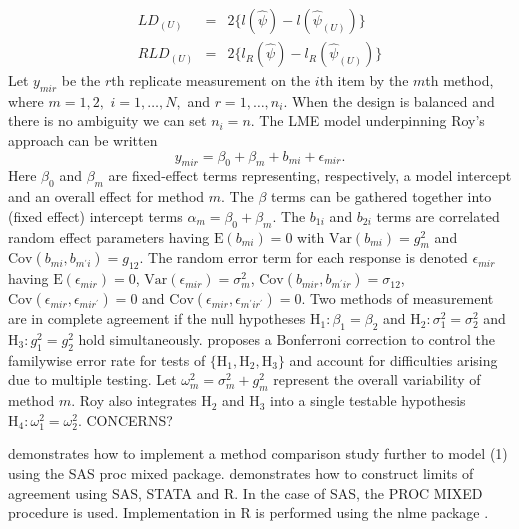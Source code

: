 \documentclass[12pt, a4paper]{article}
\begin{document}
\begin{eqnarray}
LD_{(U)} &=& 2\{l(\hat{\psi}) - l( \hat{\psi}_{(U)}) \}\\
RLD_{(U)} &=& 2\{l_{R}(\hat{\psi}) - l_{R}(\hat{\psi}_{(U)})\}
\end{eqnarray}
%
%
%
%
Let $y_{mir} $ be the $r$th replicate measurement on the $i$th item by the $m$th method, where $m=1,2,$ $i=1,\ldots,N,$ and $r = 1,\ldots,n_i.$ When the design is balanced and there is no ambiguity we can set $n_i=n.$ The LME model underpinning Roy's approach can be written
\begin{equation}
y_{mir} = \beta_{0} + \beta_{m} + b_{mi} + \epsilon_{mir}.
\end{equation}
Here $\beta_0$ and $\beta_m$ are fixed-effect terms representing, respectively, a model intercept and an overall effect for method $m.$
The $\beta$ terms can be gathered together into (fixed effect) intercept terms $\alpha_m=\beta_0+\beta_m.$ The $b_{1i}$ and $b_{2i}$ terms are correlated random effect parameters having $\mathrm{E}(b_{mi})=0$ with $\mathrm{Var}(b_{mi})=g^2_m$ and $\mathrm{Cov}(b_{mi}, b_{m^\prime i})=g_{12}.$ The random error term for each response is denoted $\epsilon_{mir}$ having $\mathrm{E}(\epsilon_{mir})=0$, $\mathrm{Var}(\epsilon_{mir})=\sigma^2_m$, $\mathrm{Cov}(b_{mir}, b_{m^\prime ir})=\sigma_{12}$, $\mathrm{Cov}(\epsilon_{mir}, \epsilon_{mir^\prime})= 0$ and $\mathrm{Cov}(\epsilon_{mir}, \epsilon_{m^\prime ir^\prime})= 0.$ Two methods of measurement are in complete agreement if the null hypotheses $\mathrm{H}_1\colon \beta_1 = \beta_2$ and $\mathrm{H}_2\colon \sigma^2_1 = \sigma^2_2 $ and $\mathrm{H}_3\colon g^2_1= g^2_2$ hold simultaneously. \citet{roy} proposes a Bonferroni correction to control the familywise error rate for tests of $\{\mathrm{H}_1, \mathrm{H}_2, \mathrm{H}_3\}$ and account for difficulties arising due to multiple testing. Let $\omega^2_m = \sigma^2_m + g^2_m$ represent the overall variability of method $m.$  Roy also integrates $\mathrm{H}_2$ and $\mathrm{H}_3$ into a single testable hypothesis $\mathrm{H}_4\colon \omega^2_1=\omega^2_2.$ CONCERNS?

\bigskip

\citet{Roy} demonstrates how to implement a method comparison study further to model (1) using the SAS proc mixed package.
\citet{BXC2008} demonstrates how to construct limits of agreement using SAS, STATA and R. In the case of SAS, the PROC MIXED procedure is used.
Implementation in R is performed using the nlme package \citep{pb2000}.
\end{document}

